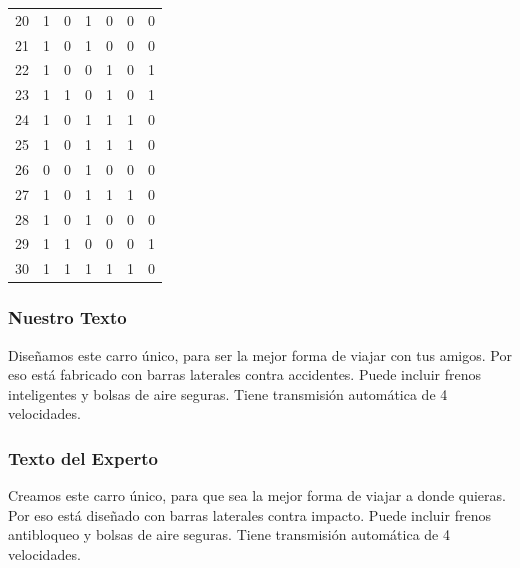\begin{table}
\begin{tabular}{|r|c|c|c|c|c|c|}
20 &         1 &         0 &         1 &         0 &         0 &         0 \\
21 &         1 &         0 &         1 &         0 &         0 &         0 \\
22 &         1 &         0 &         0 &         1 &         0 &         1 \\
23 &         1 &         1 &         0 &         1 &         0 &         1 \\
24 &         1 &         0 &         1 &         1 &         1 &         0 \\
25 &         1 &         0 &         1 &         1 &         1 &         0 \\
26 &         0 &         0 &         1 &         0 &         0 &         0 \\
27 &         1 &         0 &         1 &         1 &         1 &         0 \\
28 &         1 &         0 &         1 &         0 &         0 &         0 \\
29 &         1 &         1 &         0 &         0 &         0 &         1 \\
30 &         1 &         1 &         1 &         1 &         1 &         0 

\end{tabular}
\end{table}



\subsubsection{Nuestro Texto}

Diseñamos este carro único, para ser la mejor forma de viajar con tus amigos. Por eso está fabricado con barras laterales contra accidentes. Puede incluir frenos inteligentes y bolsas de aire seguras. Tiene transmisión automática de 4 velocidades.

\subsubsection{Texto del Experto}

Creamos este carro único, para que sea la mejor forma de viajar a donde quieras. Por eso está diseñado con barras laterales contra impacto. Puede incluir frenos antibloqueo y bolsas de aire seguras. Tiene transmisión automática de 4 velocidades.

